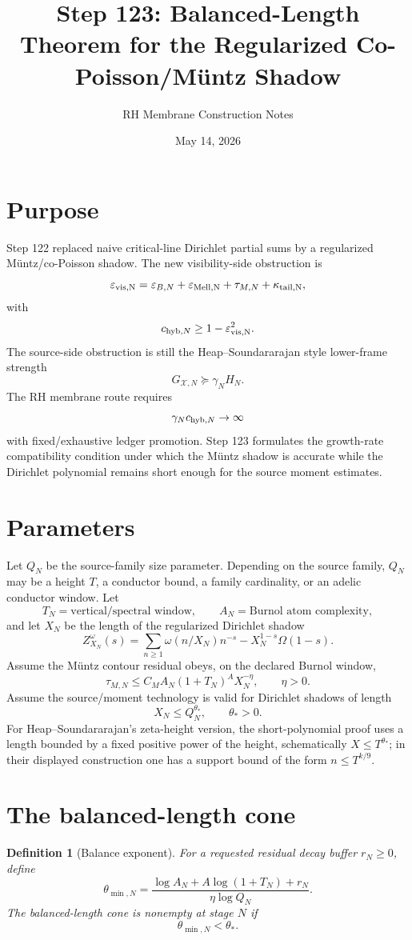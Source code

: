 \documentclass[11pt]{article}
\title{Step 123: Balanced-Length Theorem for the Regularized Co-Poisson/M\"untz Shadow}
\author{RH Membrane Construction Notes}
\date{May 14, 2026}
\newtheorem{definition}{Definition}
\newcommand{\eps}{\varepsilon}
\newcommand{\cX}{\mathcal X}
\begin{document}
\maketitle

\section{Purpose}
Step 122 replaced naive critical-line Dirichlet partial sums by a regularized M\"untz/co-Poisson shadow.  The new visibility-side obstruction is
\[
\eps_{\rm vis,N}
=\eps_{B,N}+\eps_{\rm Mell,N}+\tau_{M,N}+\kappa_{\rm tail,N},
\]
with
\[
c_{{\rm hyb},N}\ge 1-\eps_{\rm vis,N}^2.
\]
The source-side obstruction is still the Heap--Soundararajan style lower-frame strength
\[
G_{\cX,N}\succeq \gamma_N H_N.
\]
The RH membrane route requires
\[
\gamma_N c_{{\rm hyb},N}\to\infty
\]
with fixed/exhaustive ledger promotion.  Step 123 formulates the growth-rate compatibility condition under which the M\"untz shadow is accurate while the Dirichlet polynomial remains short enough for the source moment estimates.

\section{Parameters}
Let $Q_N$ be the source-family size parameter.  Depending on the source family, $Q_N$ may be a height $T$, a conductor bound, a family cardinality, or an adelic conductor window.  Let
\[
T_N=\text{vertical/spectral window},
\qquad
A_N=\text{Burnol atom complexity},
\]
and let $X_N$ be the length of the regularized Dirichlet shadow
\[
Z_{X_N}^{\omega}(s)
=\sum_{n\ge1}\omega(n/X_N)n^{-s}-X_N^{1-s}\Omega(1-s).
\]
Assume the M\"untz contour residual obeys, on the declared Burnol window,
\[
\tau_{M,N}
\le C_M A_N (1+T_N)^A X_N^{-\eta},
\qquad \eta>0.
\]
Assume the source/moment technology is valid for Dirichlet shadows of length
\[
X_N\le Q_N^{\theta_*},
\qquad \theta_*>0.
\]
For Heap--Soundararajan's zeta-height version, the short-polynomial proof uses a length bounded by a fixed positive power of the height, schematically $X\le T^{\theta_*}$; in their displayed construction one has a support bound of the form $n\le T^{k/9}$.

\section{The balanced-length cone}
\begin{definition}[Balance exponent]
For a requested residual decay buffer $r_N\ge0$, define
\[
\theta_{\min,N}
=
\frac{
\log A_N+A\log(1+T_N)+r_N
}{
\eta\log Q_N
}.
\]
The \emph{balanced-length cone} is nonempty at stage $N$ if
\[
\boxed{\theta_{\min,N}<\theta_*.}
\]
\end{definition}
\end{document}
